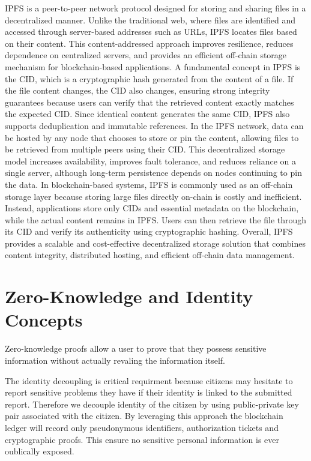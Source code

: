 \ac{IPFS} is a peer-to-peer network protocol designed for storing and sharing files in a decentralized manner. Unlike the traditional web, where files are identified and accessed through server-based addresses such as URLs, \ac{IPFS} locates files based on their content. This content-addressed approach improves resilience, reduces dependence on centralized servers, and provides an efficient off-chain storage mechanism for blockchain-based applications. A fundamental concept in \ac{IPFS} is the \ac{CID}, which is a cryptographic hash generated from the content of a file. If the file content changes, the \ac{CID} also changes, ensuring strong integrity guarantees because users can verify that the retrieved content exactly matches the expected \ac{CID}. Since identical content generates the same \ac{CID}, \ac{IPFS} also supports deduplication and immutable references. In the \ac{IPFS} network, data can be hosted by any node that chooses to store or pin the content, allowing files to be retrieved from multiple peers using their \ac{CID}. This decentralized storage model increases availability, improves fault tolerance, and reduces reliance on a single server, although long-term persistence depends on nodes continuing to pin the data. In blockchain-based systems, \ac{IPFS} is commonly used as an off-chain storage layer because storing large files directly on-chain is costly and inefficient. Instead, applications store only \ac{CID}s and essential metadata on the blockchain, while the actual content remains in \ac{IPFS}. Users can then retrieve the file through its \ac{CID} and verify its authenticity using cryptographic hashing. Overall, \ac{IPFS} provides a scalable and cost-effective decentralized storage solution that combines content integrity, distributed hosting, and efficient off-chain data management.
\section{Zero-Knowledge and Identity Concepts}

Zero-knowledge proofs allow a user to prove that they possess sensitive information without actually revaling the information itself. 

The identity decoupling is critical requirment because citizens may hesitate to report sensitive problems they have if their identity is linked to the submitted report. Therefore we decouple identity of the citizen by using public-private key pair associated with the citizen. By leveraging this approach the blockchain ledger will record only pseudonymous identifiers, authorization tickets and cryptographic proofs. This ensure no sensitive personal information is ever oublically exposed.

